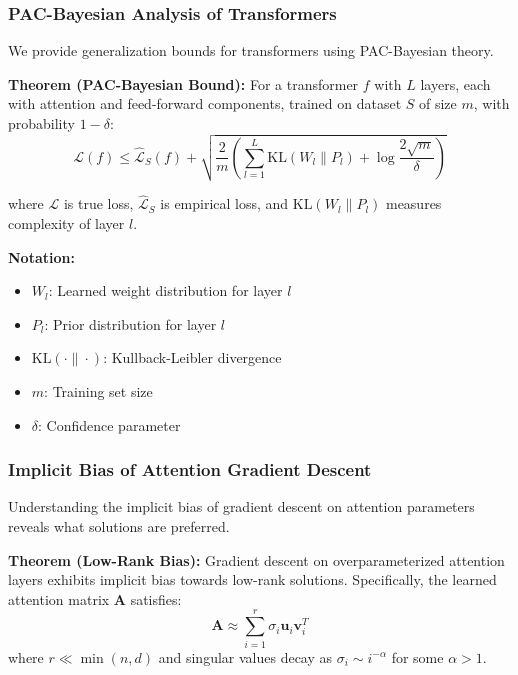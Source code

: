 \documentclass[11pt]{article}
\begin{document}
\subsubsection{PAC-Bayesian Analysis of Transformers}

We provide generalization bounds for transformers using PAC-Bayesian theory.

\textbf{Theorem (PAC-Bayesian Bound):} For a transformer $f$ with $L$ layers, each with attention and feed-forward components, trained on dataset $S$ of size $m$, with probability $1-\delta$:
\begin{equation}
\mathcal{L}(f) \leq \hat{\mathcal{L}}_S(f) + \sqrt{\frac{2}{m}\left(\sum_{l=1}^L \text{KL}(W_l \| P_l) + \log\frac{2\sqrt{m}}{\delta}\right)}
\end{equation}

where $\mathcal{L}$ is true loss, $\hat{\mathcal{L}}_S$ is empirical loss, and $\text{KL}(W_l \| P_l)$ measures complexity of layer $l$.

\begin{notationbox}
\textbf{Notation:}
\begin{itemize}
    \item $W_l$: Learned weight distribution for layer $l$
    \item $P_l$: Prior distribution for layer $l$
    \item $\text{KL}(\cdot \| \cdot)$: Kullback-Leibler divergence
    \item $m$: Training set size
    \item $\delta$: Confidence parameter
\end{itemize}
\end{notationbox}

\subsubsection{Implicit Bias of Attention Gradient Descent}

Understanding the implicit bias of gradient descent on attention parameters reveals what solutions are preferred.

\textbf{Theorem (Low-Rank Bias):} Gradient descent on overparameterized attention layers exhibits implicit bias towards low-rank solutions. Specifically, the learned attention matrix $\mathbf{A}$ satisfies:
\begin{equation}
\mathbf{A} \approx \sum_{i=1}^r \sigma_i \mathbf{u}_i \mathbf{v}_i^T
\end{equation}
where $r \ll \min(n, d)$ and singular values decay as $\sigma_i \sim i^{-\alpha}$ for some $\alpha > 1$.
\end{document}
